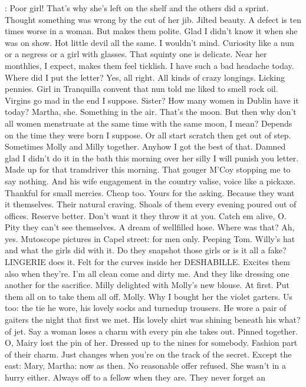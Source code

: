 \Bloom:
Poor girl! That's why she's left
on the shelf and the others did a sprint. Thought something was wrong by
the cut of her jib. Jilted beauty. A defect is ten times worse in a woman.
But makes them polite. Glad I didn't know it when she was on show. Hot
little devil all the same. I wouldn't mind. Curiosity like a nun or a
negress or a girl with glasses. That squinty one is delicate. Near her
monthlies, I expect, makes them feel ticklish. I have such a bad headache
today. Where did I put the letter? Yes, all right. All kinds of crazy
longings. Licking pennies. Girl in Tranquilla convent that nun told
me liked to smell rock oil. Virgins go mad in the end I suppose.
Sister? How many women in Dublin have it today? Martha, she. Something
in the air. That's the moon. But then why don't all women menstruate
at the same time with the same moon, I mean? Depends on the time
they were born I suppose. Or all start scratch then get out of step.
Sometimes Molly and Milly together. Anyhow I got the best of that.
Damned glad I didn't do it in the bath this morning over her silly
I will punish you letter. Made up for that tramdriver this morning.
That gouger M'Coy stopping me to say nothing. And his wife
engagement in the country valise, voice like a pickaxe. Thankful for small
mercies. Cheap too. Yours for the asking. Because they want it themselves.
Their natural craving. Shoals of them every evening poured out of offices.
Reserve better. Don't want it they throw it at you. Catch em alive, O.
Pity they can't see themselves. A dream of wellfilled hose. Where was
that? Ah, yes. Mutoscope pictures in Capel street: for men only. Peeping
Tom. Willy's hat and what the girls did with it. Do they snapshot
those girls or is it all a fake? LINGERIE does it. Felt for the
curves inside her DESHABILLE. Excites them also when they're. I'm all
clean come and dirty me. And they like dressing one another for the
sacrifice. Milly delighted with Molly's new blouse. At first.
Put them all on to take them all off. Molly. Why I bought her the violet
garters. Us too: the tie he wore, his lovely socks and turnedup trousers.
He wore a pair of gaiters the night that first we met. His lovely
shirt was shining beneath his what? of jet. Say a woman loses a charm with
every pin she takes out. Pinned together. O, Mairy lost the pin of her.
Dressed up to the nines for somebody. Fashion part of their charm. Just
changes when you're on the track of the secret. Except the east: Mary,
Martha: now as then. No reasonable offer refused. She wasn't in a hurry
either. Always off to a fellow when they are. They never forget an

